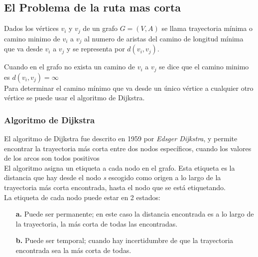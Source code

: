 
    \subsection{El Problema de la ruta mas corta} %
    \label{sec:ruta_mas_corta}
      Dados los vértices $v_{i}$ y $v_{j}$ de un grafo $G = (V,A)$ se llama trayectoria mínima o camino minimo  de \(v_i\) a \(v_j\) al numero de aristas del camino de longitud mínima que va desde $v_i$ a $v_j$ y se representa por $d(v_i, v_j)$.

      Cuando en el grafo no exista un camino de $v_i$ a $v_j$ se dice que el camino minimo es $d(v_i, v_j) = \infty$ \\

      Para determinar el camino mínimo que va desde un único vértice a cualquier otro vértice se puede usar el algoritmo de Dijkstra.



      \subsubsection{Algoritmo de Dijkstra} %
      \label{sub:algoritmo_de_dijkstra}
      El algoritmo de  Dijkstra fue descrito en 1959 por \emph{Edsger Dijkstra}, y permite encontrar la trayectoria más corta entre dos nodos específicos, cuando los valores de los arcos son todos positivos\\

      El algoritmo asigna un etiqueta a cada nodo en el grafo. Esta etiqueta es la distancia que hay desde el nodo \emph{s} escogido como origen a lo largo de la trayectoria más corta encontrada, hasta el nodo que se está etiquetando.\\

      La etiqueta de cada nodo puede estar en 2 estados:

      \begin{itemize}
        \item[\textbf{a.}] Puede ser permanente; en este caso la distancia encontrada es a lo largo de la trayectoria, la más corta de todas las encontradas.
        \item[\textbf{b.}] Puede ser temporal; cuando hay incertidumbre de que la trayectoria encontrada sea la más corta de todas.
      \end{itemize}

